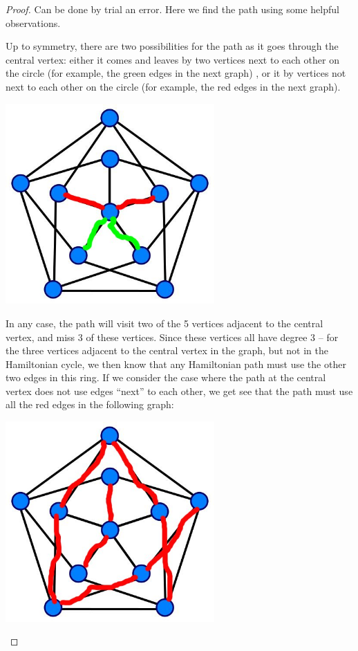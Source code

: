 \documentclass{amsart}
\begin{document}
\begin{proof}
Can be done by trial an error.  Here we find the path using some helpful observations.

 Up to symmetry, there are two possibilities for the path as it goes through the central vertex: either it comes and leaves by two vertices next to each other on the circle (for example, the green edges in the next graph) , or it by vertices not next to each other on the circle (for example, the red edges in the next graph).  

\begin{center} 
\includegraphics[width=8cm]{PS1RG.jpg}
\end{center}


In any case, the path will visit two of the 5 vertices adjacent to the central vertex, and miss 3 of these vertices.  Since these vertices all have degree 3 -- for the three vertices adjacent to the central vertex in the graph, but not in the Hamiltonian cycle, we then know that any Hamiltonian path must use the other two edges in this ring.  If we consider the case where the path at the central vertex does not use edges ``next'' to each other, we get see that the path must use all the red edges in the following graph:

\begin{center} 
\includegraphics[width=8cm]{PS1S1.jpg}
\end{center}


\end{proof}
\end{document}
